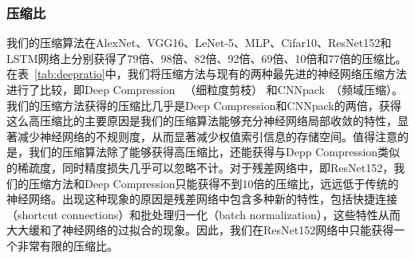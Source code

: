 \subsubsection{压缩比}
我们的压缩算法在AlexNet、VGG16、LeNet-5、MLP、Cifar10、ResNet152和LSTM网络上分别获得了79倍、98倍、82倍、92倍、69倍、10倍和77倍的压缩比。在表~\ref{tab:deepratio}中，我们将压缩方法与现有的两种最先进的神经网络压缩方法进行了比较，即Deep Compression~\cite{han2015deep} （细粒度剪枝） 和CNNpack~\cite{wang2016cnnpack}（频域压缩）。我们的压缩方法获得的压缩比几乎是Deep Compression和CNNpack的两倍，获得这么高压缩比的主要原因是我们的压缩算法能够充分神经网络局部收敛的特性，显著减少神经网络的不规则度，从而显著减少权值索引信息的存储空间。值得注意的是，我们的压缩算法除了能够获得高压缩比，还能获得与Depp Compression类似的稀疏度，同时精度损失几乎可以忽略不计。对于残差网络中，即ResNet152，我们的压缩方法和Deep Compression只能获得不到10倍的压缩比，远远低于传统的神经网络。出现这种现象的原因是残差网络中包含多种新的特性，包括快捷连接（shortcut connections）和批处理归一化（batch normalization），这些特性从而大大缓和了神经网络的过拟合的现象。因此，我们在ResNet152网络中只能获得一个非常有限的压缩比。

